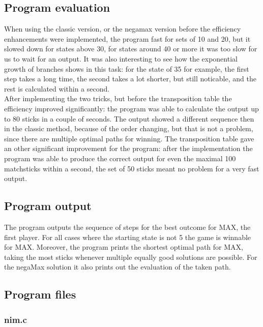 \documentclass{article}
\begin{document}
\subsection*{Program evaluation}
When using the classic version, or the negamax version before the efficiency enhancements were implemented, the program fast for sets of 10 and 20, but it slowed down for states above 30, for states around 40 or more it was too slow for us to wait for an output. It was also interesting to see how the exponential growth of branches shows in this task: for the state of 35 for example, the first step takes a long time, the second takes a lot shorter, but still noticable, and the rest is calculated within a second.\\
After implementing the two tricks, but before the transposition table the efficiency improved significantly: the program was able to calculate the output up to 80 sticks in a couple of seconds. The output showed a different sequence then in the classic method, because of the order changing, but that is not a problem, since there are multiple optimal paths for winning.
The transposition table gave an other significant improvement for the program: after the implementation the program was able to produce the correct output for even the maximal 100 matchsticks within a second, the set of 50 sticks meant no problem for a very fast output.

\subsection*{Program output}
The program outputs the sequence of steps for the best outcome for MAX, the first player. For all cases where the starting state is not 5 the game is winnable for MAX. Moreover, the program prints the shortest optimal path for MAX, taking the most sticks whenever multiple equally good solutions are possible. For the negaMax solution it also prints out the evaluation of the taken path.

\subsection*{Program files}
\subsubsection*{nim.c}

\end{document}
